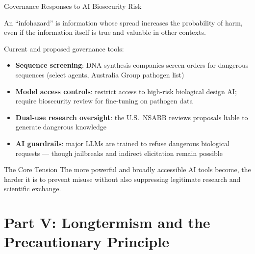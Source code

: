 \documentclass[aspectratio=169,11pt]{beamer}
\begin{document}
\begin{frame}[shrink=17]{Governance Responses to AI Biosecurity Risk}
\begin{conceptbox}
An ``infohazard'' is information whose spread increases the probability of harm, even if the information itself is true and valuable in other contexts.
\end{conceptbox}

\vspace{0.2cm}
Current and proposed governance tools:
\begin{itemize}
    \item \textbf{Sequence screening}: DNA synthesis companies screen orders for dangerous sequences (select agents, Australia Group pathogen list)
    \item \textbf{Model access controls}: restrict access to high-risk biological design AI; require biosecurity review for fine-tuning on pathogen data
    \item \textbf{Dual-use research oversight}: the U.S.\ NSABB reviews proposals liable to generate dangerous knowledge
    \item \textbf{AI guardrails}: major LLMs are trained to refuse dangerous biological requests --- though jailbreaks and indirect elicitation remain possible
\end{itemize}

\begin{alertblock}{The Core Tension}
\scriptsize
The more powerful and broadly accessible AI tools become, the harder it is to prevent misuse without also suppressing legitimate research and scientific exchange.
\end{alertblock}
\end{frame}

\section{Part V: Longtermism and the Precautionary Principle}
\end{document}
